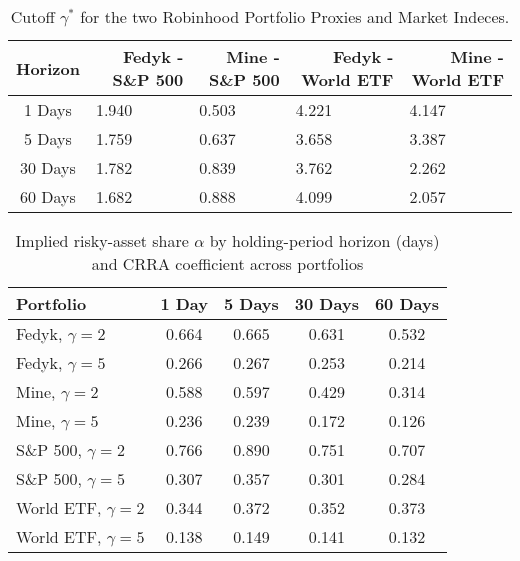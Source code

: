 \begin{appendices}
\begin{table}[ht]
\centering
\caption{Cutoff $\gamma^*$ for the two Robinhood Portfolio Proxies and Market Indeces.}
\begin{tabular}{cllll}
    \toprule
    \multicolumn{1}{r}{\textbf{Horizon}} & \multicolumn{1}{r}{\textbf{Fedyk - S\&P 500}} & \multicolumn{1}{r}{\textbf{Mine - S\&P 500}} & \multicolumn{1}{r}{\textbf{Fedyk - World ETF}} & \multicolumn{1}{r}{\textbf{Mine - World ETF}} \\
    \midrule
    1 Days                        & 1.940                                         & 0.503                                          & 4.221                                          & 4.147                                           \\
    5 Days                        & 1.759                                         & 0.637                                          & 3.658                                          & 3.387                                           \\
    30 Days                       & 1.782                                         & 0.839                                          & 3.762                                          & 2.262                                           \\
    60 Days                       & 1.682                                         & 0.888                                          & 4.099                                          & 2.057                                          
\end{tabular}
\label{tab:cutoff_gamma}
\end{table}
    
\begin{table}[ht]
\centering
\caption{Implied risky-asset share $\alpha$ by holding-period horizon (days) and CRRA coefficient across portfolios}
\label{tab:gamma_implied}
\begin{tabular}{l|c c c c}
    \toprule
    \textbf{Portfolio} & \textbf{1 Day} & \textbf{5 Days} & \textbf{30 Days} & \textbf{60 Days} \\
    \midrule
    Fedyk, $\gamma=2$   & 0.664 & 0.665 & 0.631 & 0.532 \\
    Fedyk, $\gamma=5$   & 0.266 & 0.267 & 0.253 & 0.214 \\
    Mine,  $\gamma=2$   & 0.588 & 0.597 & 0.429 & 0.314 \\
    Mine,  $\gamma=5$   & 0.236 & 0.239 & 0.172 & 0.126 \\
    S\&P 500, $\gamma=2$ & 0.766 & 0.890 & 0.751 & 0.707 \\
    S\&P 500, $\gamma=5$ & 0.307 & 0.357 & 0.301 & 0.284 \\
    World ETF, $\gamma=2$& 0.344 & 0.372 & 0.352 & 0.373 \\
    World ETF, $\gamma=5$& 0.138 & 0.149 & 0.141 & 0.132 \\
    \end{tabular}
\end{table}
    

\end{appendices}
